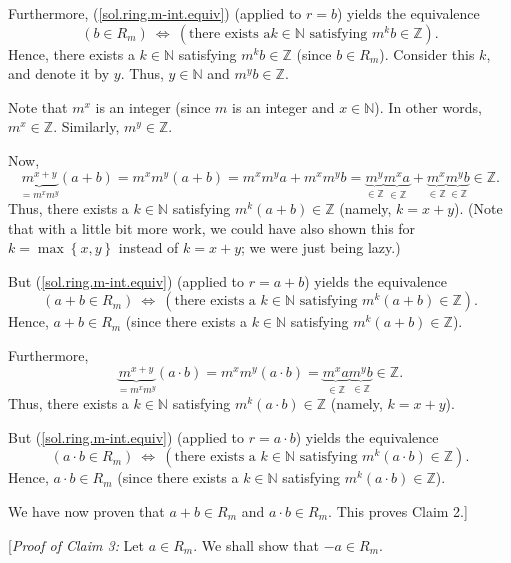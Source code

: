 \documentclass[paper=a4, fontsize=12pt]{scrartcl}%
\theoremstyle{plainsl}
\theoremstyle{definition}
\theoremstyle{remark}
\begin{document}
Furthermore, (\ref{sol.ring.m-int.equiv}) (applied to $r=b$) yields the
equivalence
\[
\left(  b\in R_{m}\right)  \ \Longleftrightarrow\ \left(  \text{there exists a
}k\in\mathbb{N}\text{ satisfying }m^{k}b\in\mathbb{Z}\right)  .
\]
Hence, there exists a $k\in\mathbb{N}$ satisfying $m^{k}b\in\mathbb{Z}$ (since
$b\in R_{m}$). Consider this $k$, and denote it by $y$. Thus, $y\in\mathbb{N}$
and $m^{y}b\in\mathbb{Z}$.

Note that $m^{x}$ is an integer (since $m$ is an integer and $x\in\mathbb{N}%
$). In other words, $m^{x}\in\mathbb{Z}$. Similarly, $m^{y}\in\mathbb{Z}$.

Now,
\[
\underbrace{m^{x+y}}_{=m^{x}m^{y}}\left(  a+b\right)  =m^{x}m^{y}\left(
a+b\right)  =m^{x}m^{y}a+m^{x}m^{y}b=\underbrace{m^{y}}_{\in\mathbb{Z}%
}\underbrace{m^{x}a}_{\in\mathbb{Z}}+\underbrace{m^{x}}_{\in\mathbb{Z}%
}\underbrace{m^{y}b}_{\in\mathbb{Z}}\in\mathbb{Z}.
\]
Thus, there exists a $k\in\mathbb{N}$ satisfying $m^{k}\left(  a+b\right)
\in\mathbb{Z}$ (namely, $k=x+y$). (Note that with a little bit more work, we
could have also shown this for $k=\max\left\{  x,y\right\}  $ instead of
$k=x+y$; we were just being lazy.)

But (\ref{sol.ring.m-int.equiv}) (applied to $r=a+b$) yields the equivalence
\[
\left(  a+b\in R_{m}\right)  \ \Longleftrightarrow\ \left(  \text{there exists
a }k\in\mathbb{N}\text{ satisfying }m^{k}\left(  a+b\right)  \in
\mathbb{Z}\right)  .
\]
Hence, $a+b\in R_{m}$ (since there exists a $k\in\mathbb{N}$ satisfying
$m^{k}\left(  a+b\right)  \in\mathbb{Z}$).

Furthermore,%
\[
\underbrace{m^{x+y}}_{=m^{x}m^{y}}\left(  a\cdot b\right)  =m^{x}m^{y}\left(
a\cdot b\right)  =\underbrace{m^{x}a}_{\in\mathbb{Z}}\underbrace{m^{y}b}%
_{\in\mathbb{Z}}\in\mathbb{Z}.
\]
Thus, there exists a $k\in\mathbb{N}$ satisfying $m^{k}\left(  a\cdot
b\right)  \in\mathbb{Z}$ (namely, $k=x+y$).

But (\ref{sol.ring.m-int.equiv}) (applied to $r=a\cdot b$) yields the
equivalence
\[
\left(  a\cdot b\in R_{m}\right)  \ \Longleftrightarrow\ \left(  \text{there
exists a }k\in\mathbb{N}\text{ satisfying }m^{k}\left(  a\cdot b\right)
\in\mathbb{Z}\right)  .
\]
Hence, $a\cdot b\in R_{m}$ (since there exists a $k\in\mathbb{N}$ satisfying
$m^{k}\left(  a\cdot b\right)  \in\mathbb{Z}$).

We have now proven that $a+b\in R_{m}$ and $a\cdot b\in R_{m}$. This proves
Claim 2.]

[\textit{Proof of Claim 3:} Let $a\in R_{m}$. We shall show that $-a\in R_{m}$.
\end{document}
